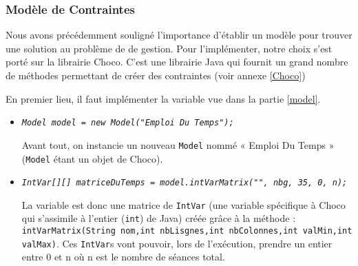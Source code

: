 \documentclass[12pt,a4paper]{article}
\begin{document}
\subsubsection{Modèle de Contraintes}

Nous avons précédemment souligné l'importance d'établir un modèle pour trouver une solution au problème de de gestion. Pour l'implémenter, notre choix s'est porté sur la librairie Choco. C'est une librairie Java qui fournit un grand nombre de méthodes permettant de créer des contraintes (voir annexe \autoref{Choco})

En premier lieu, il faut implémenter la variable vue dans la partie \ref{model}.

\begin{itemize}[label=\textbullet]
\item
\textit{\texttt{Model model = new Model("Emploi Du Temps");}}

Avant tout, on instancie un nouveau \texttt{Model} nommé « Emploi Du Temps » (\texttt{Model} étant un objet de Choco).

\item
\textit{\texttt{IntVar[][] matriceDuTemps = model.intVarMatrix("", nbg, 35, 0, n);}}

La variable est donc une matrice de \texttt{IntVar} (une variable spécifique à Choco qui s'assimile à l'entier (\texttt{int}) de Java) créée grâce à la méthode :\\ \texttt{intVarMatrix(String nom,int nbLisgnes,int nbColonnes,int valMin,int valMax)}.
Ces \texttt{IntVar}s vont pouvoir, lors de l'exécution, prendre un entier entre 0 et n où n est le nombre de séances total.
\end{itemize}
\end{document}
